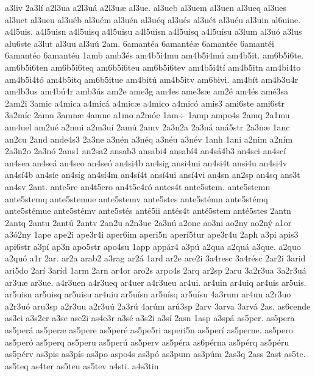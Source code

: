 {a3liv
2a3l^^ed
a2l3ua
a2l3u^^e1
a2l3u^^e6
al3ue.
al3ueb
al3uem
al3uen
al3ueq
al3ues
al3uet
al3ueu
al3u^^e9b
al3u^^e9m
al3u^^e9n
al3u^^e9q
al3u^^e9s
al3u^^e9t
al3u^^e9u
al3uin
al6uine.
a4l5uis.
a4l5uisn
a4l5uisq
a4l5uisu
a4l5u^^edsn
a4l5u^^edsq
a4l5u^^edsu
a3lum
al3u^^f3
a3lus
alu6ste
a3lut
al3uu
al3u^^fa
2am.
6amant^^e9a
6amant^^e9^^e6
6amant^^e9e
6amant^^e9i
6amant^^e9o
6amant^^e9u
1amb
amb3^^e9s
am4b5i4mu
am4b5i4m^^fa
am4b5it.
am6b5i6te.
am6b5i6ten
am6b5i6teq
am6b5i6teu
am6b5i6tev
am4b5i4t^^ed
am4b5itn
am4bi4to
am4b5i4t^^f3
am4b5itq
am6b5itue
am4bit^^fa
am4b5itv
am6bivi.
am4b^^edt
am4b3u4r
am4b3us
am4b^^fa4r
amb3^^fas
am2e
ame3g
am4es
ame3s^^e6
am2^^e9
am4^^e9s
am^^e93sa
2am2i
3amic
a4mica
a4mic^^e1
a4mic^^e6
a4mico
a4mic^^f3
amis3
ami6ste
ami6str
3a2m^^edc
2amn
3amn^^e6
4amne
a1mo
a2m^^f3e
1am^^f7
1amp
ampo4s
2amq
2a1mu
am4uel
am2u^^e9
a2mui
a2m3u^^ed
2am^^fa
2amv
2a3n2a
2a3n^^e1
an^^e15str
2a3n^^e6
1anc
an2cu
2and
ande4s3
2a3ne
a3n^^e9n
a3n^^e9q
a3n^^e9u
a3n^^e9v
1anh
1ani
a2nim
a2n^^edm
2a3n2o
2a3n^^f3
2ans1
an2sa2
ansab3
ansabi4
ansab^^ed4
an4s^^e14b3
an4sci
an4sc^^ed
an4sea
an4se^^e1
an4seo
an4se^^f3
an4si4b
an4sig
ansi4mi
an4si4t
ansi4u
an4si4v
an4s^^ed4b
an4s^^ede
an4s^^edg
an4s^^ed4m
an4s^^ed4t
ans^^ed4ui
ans^^ed4vi
an4sn
an2sp
an4sq
ans3t
an4sv
2ant.
ante5re
an4t5ero
an4t5e4r^^f3
antes4t
ante5stem.
ante5stemn
ante5stemq
ante5stemue
ante5stemv
ante5stes
ante5st^^e9mn
ante5st^^e9mq
ante5st^^e9mue
ante5st^^e9mv
ante5st^^e9s
ant^^e95ii
ant^^e9s4t
ant^^e95stem
ant^^e95stes
2antn
2antq
2antu
2ant^^fa
2antv
2an2u
a2n3ue
2a3n^^fa
a2one
ao3ni
ao2ny
ao2n^^fd
a1or
a3^^f32ny
1ape
ape2i
ape3r4i
aper6im
aperi5n
aper^^ed5tur
ape3r4u
2aph
a3pi
apis3
api6str
a3p^^ed
ap3n
apo5str
apo4su
1app
app^^e1r4
a3p^^fa
a2qua
a2qu^^e1
a3que.
a2quo
a2qu^^f3
a1r
2ar.
ar2a
arab2
a3rag
ar2^^e1
1ard
ar2e
are2i
3a4resc
3a4r^^e9sc
2ar2i
3arid
ari5do
2ar^^ed
3ar^^edd
1arm
2arn
ar4or
aro2s
arpo4s
2arq
ar2sp
2aru
3a2r3ua
3a2r3u^^e1
ar3u^^e6
ar3ue.
a4r3uen
a4r3ueq
ar4uer
a4r3ueu
ar4ui.
ar4uin
ar4uiq
ar4uis
ar5uis.
ar5uisn
ar5uisq
ar5uisu
ar4uiu
ar5u^^edsn
ar5u^^edsq
ar5u^^edsu
4a3rum
ar4un
a2r3uo
a2r3u^^f3
aru3sp
a2r3uu
a2r3u^^fa
2a3r^^fa
4ar^^fam
ar^^fa3sp
2arv
3arva
3arv^^e1
2as.
as6cende
as3ci
a3s2cr
a3se
ase2i
as4e3r
a3s^^e9
a3s2i
a3s^^ed
2asn
1asp
a3sp^^e1
as5per.
as5pera
as5per^^e1
as5per^^e6
as5pere
as5per^^e9
as5pe5ri
asperi5n
as5per^^ed
as5perne.
as5pero
as5per^^f3
as5perq
as5peru
as5per^^fa
as5perv
as5p^^e9ra
as6p^^e9rna
as5p^^e9rq
as5p^^e9ru
as5p^^e9rv
as3pis
as3p^^eds
as3po
aspo4s
as3p^^f3
as3pum
as3p^^fam
2as3q
2ass
2ast
as5te.
as5teq
as4ter
as5teu
as5tev
a4sti.
a4s3tin
}
